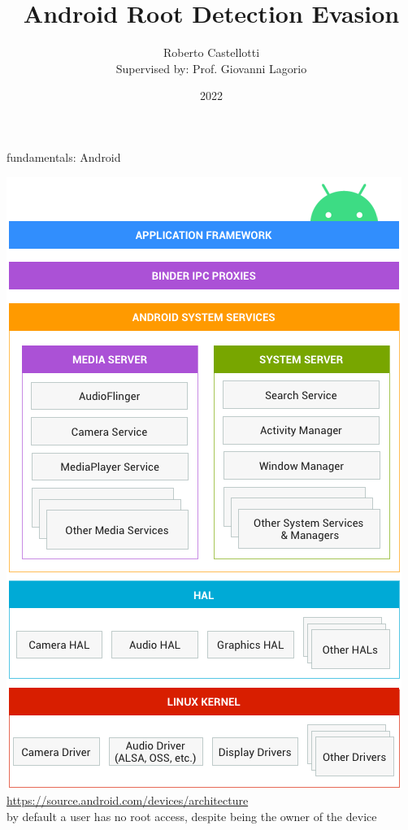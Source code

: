 \documentclass{beamer}
\title{Android Root Detection Evasion}
\author[Roberto Castellotti]{Roberto Castellotti \\ {\small Supervised by: Prof. Giovanni Lagorio}}
\institute{Università di Genova}
\date{2022}
\begin{document}
\frame{\titlepage}

\begin{frame}{fundamentals: Android}

    \centering \includegraphics[scale=0.25]{android.png}
    \href{https://source.android.com/devices/architecture}{https://source.android.com/devices/architecture} \\
    by default a user has no root access, despite being the owner of the device
\end{frame}
\end{document}
